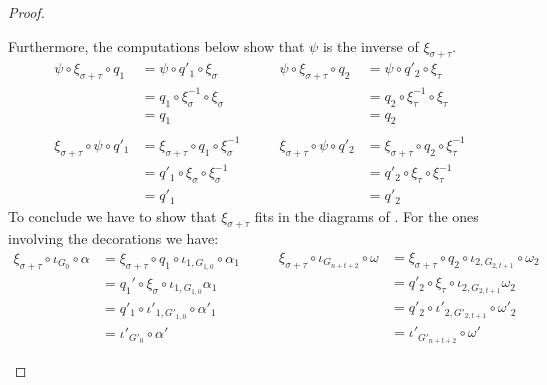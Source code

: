 \begin{proof}
\begin{itemize}
		Furthermore, the computations below show that $\psi$ is the inverse of $\xi_{\sigma+\tau}$.
		\[\begin{split}
			\psi \circ \xi_{\sigma+\tau}\circ  q_1&=\psi \circ q'_1\circ \xi_\sigma \\&=q_1\circ \xi^{-1}_{\sigma}\circ \xi_\sigma\\&=q_1\\\\
			\xi_{\sigma+\tau}\circ \psi \circ q'_1&=\xi_{\sigma+\tau}\circ q_1\circ \xi^{-1}_\sigma \\&=q'_1\circ \xi_{\sigma}\circ \xi^{-1}_\sigma\\&=q'_1
		\end{split}\qquad \begin{split}
			\psi \circ \xi_{\sigma+\tau}\circ  q_2&=\psi \circ q'_2\circ \xi_\tau \\&=q_2\circ \xi^{-1}_{\tau}\circ \xi_\tau\\&=q_2\\ \\ 	\xi_{\sigma+\tau}\circ \psi \circ q'_2&=\xi_{\sigma+\tau}\circ q_2\circ \xi^{-1}_\tau \\&=q'_2\circ \xi_{\tau}\circ \xi^{-1}_\tau\\&=q'_2
		\end{split}\]
		To conclude we have to show that $\xi_{\sigma+\tau}$ fits in the diagrams of .  For the ones involving the decorations we have:
		\[\begin{split}
			\xi_{\sigma+\tau} \circ \iota_{G_{0}}\circ \alpha&=\xi_{\sigma+\tau} \circ q_1 \circ \iota_{1,G_{1,0}}\circ \alpha_1\\&=q_1'\circ \xi_\sigma \circ  \iota_{1,G_{1,0}} \alpha_1\\&=q'_1\circ \iota'_{1, G'_{1,0}}\circ \alpha'_1\\&=\iota'_{G'_0}\circ \alpha'
		\end{split}  \qquad 
		\begin{split}
			\xi_{\sigma+\tau} \circ \iota_{G_{n+t+2}}\circ \omega&=\xi_{\sigma+\tau} \circ q_2 \circ \iota_{2,G_{2,t+1}}\circ \omega_2\\&=q'_2\circ \xi_\tau \circ  \iota_{2,G_{2,t+1}} \omega_2\\&=q'_2\circ \iota'_{2, G'_{2,t+1}}\circ \omega'_2\\&=\iota'_{G'_{n+t+2}}\circ \omega'
		\end{split}  \]
		

\end{itemize}
\end{proof}
